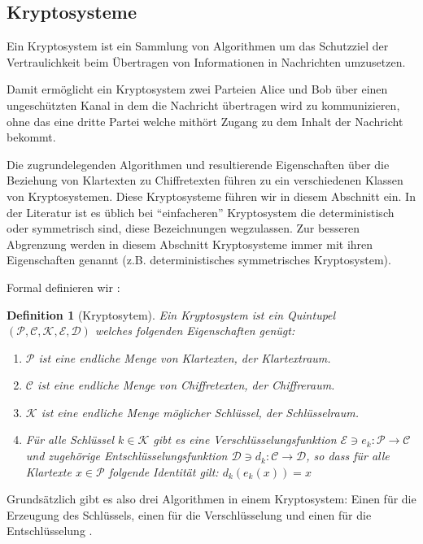 \documentclass[12pt,a4paper]{scrartcl}	%
\begin{document}
\subsection{Kryptosysteme}
Ein Kryptosystem ist ein Sammlung von Algorithmen um das Schutzziel der Vertraulichkeit beim Übertragen von Informationen in Nachrichten umzusetzen.

Damit ermöglicht ein Kryptosystem zwei Parteien Alice und Bob über einen ungeschützten Kanal in dem die Nachricht übertragen wird zu kommunizieren, ohne das eine dritte Partei welche mithört Zugang zu dem Inhalt der Nachricht bekommt.

Die zugrundelegenden Algorithmen und resultierende Eigenschaften über die Beziehung von Klartexten zu Chiffretexten führen zu ein verschiedenen Klassen von Kryptosystemen. Diese Kryptosysteme führen wir in diesem Abschnitt ein. In der Literatur ist es üblich bei \enquote{einfacheren} Kryptosystem die deterministisch oder symmetrisch sind, diese Bezeichnungen wegzulassen. Zur besseren Abgrenzung werden in diesem Abschnitt Kryptosysteme immer mit ihren Eigenschaften genannt (z.B. deterministisches symmetrisches Kryptosystem).

Formal definieren wir \cite[p.1]{stinson2006cryptography}:

\newtheorem{theorem}{Definition}[section]
\begin{theorem}[Kryptosytem]
\label{KS}
	Ein Kryptosystem ist ein Quintupel $(\mathcal{P},\mathcal{C},\mathcal{K},\mathcal{E},\mathcal{D})$ welches folgenden Eigenschaften genügt:
	\begin{enumerate}
		\item $\mathcal{P}$ ist eine endliche Menge von Klartexten, der Klartextraum.
		\item $\mathcal{C}$ ist eine endliche Menge von Chiffretexten, der Chiffreraum.
		\item $\mathcal{K}$ ist eine endliche Menge möglicher Schlüssel, der Schlüsselraum.
		\item Für alle Schlüssel $k\in \mathcal{K}$ gibt es eine Verschlüsselungsfunktion $\mathcal{E}\ni e_k:\mathcal{P}\rightarrow\mathcal{C}$ und zugehörige Entschlüsselungsfunktion $\mathcal{D}\ni d_k:\mathcal{C}\rightarrow\mathcal{D}$, so dass für alle Klartexte $x\in\mathcal{P}$ folgende Identität gilt: $d_k(e_k(x)) = x$
	\end{enumerate}
\end{theorem}

Grundsätzlich gibt es also drei Algorithmen in einem Kryptosystem: Einen für die Erzeugung des Schlüssels, einen für die Verschlüsselung und einen für die Entschlüsselung \cite{Cryptosy29:online}.
\end{document}
